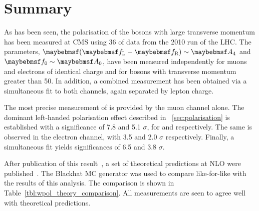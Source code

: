 




\section{Summary}
As has been seen, the polarisation of the \PW bosons with large transverse
momentum has been measured at \ac{CMS} using \unit{36}{\invpb} of data from the
2010 run of the \ac{LHC}. The parameters, $\fLmfR \sim \Afour$ and
$\f0\sim\Azero$, have been measured independently for muons and electrons of
identical charge and for \PW bosons with transverse momentum greater than
\unit{50}{\GeV}. In addition, a combined measurement has been obtained via a
simultaneous fit to both channels, again separated by lepton charge.

The most precise measurement of \fLmfR is provided by the muon channel
alone. The dominant left-handed polarisation effect described in
\sec~\ref{sec:polarisation} is established with a significance of 7.8 and 5.1
$\sigma$, for \PWp and \PWm respectively. The same is observed in the electron
channel, with 3.5 and 2.0 $\sigma$ respectively. Finally, a simultaneous fit
yields significances of 6.5 and 3.8 $\sigma$.

After publication of this result~\cite{cms_wpol_paper}, a set of theoretical
predictions at \ac{NLO} were published~\cite{berger_left_handed_w}. The Blackhat
\ac{MC} generator was used to compare like-for-like with the results of this
analysis. The comparison is shown in Table~\ref{tbl:wpol_theory_comparison}. All
measurements are seen to agree well with theoretical predictions.

